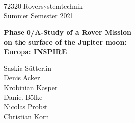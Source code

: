 %
%
\begin{titlepage}
\begin{center}



  \vspace{10mm} 
         {\large \hspace{13mm} \\
         \large \hspace{13mm} \\
         \large \hspace{13mm} \\
         \large \hspace{13mm} 72320 Roversystemtechnik\\
         \centering 
         \hspace{13mm} Summer Semester 2021\\   }
  \vspace{10mm}

         {\Large
          \bf
          \hspace{20mm} Phase 0/A-Study of a Rover Mission \\} 
         {\Large
          \bf
          \hspace{20mm} on the surface of the Jupiter moon:\\
          } 
         {\Large
          \bf
          \hspace{20mm} Europa: INSPIRE\\
          }
 

  \vspace{30mm}
         {\large \hspace{20mm}Saskia Sütterlin}\\       
         {\large \hspace{20mm}Denis Acker}\\
         {\large \hspace{20mm}Krobinian Kasper}\\
         {\large \hspace{20mm}Daniel Bölke}\\
         {\large \hspace{20mm}Nicolas Probst}\\    
         {\large \hspace{20mm}Christian Korn}\\
  \vspace{20mm}
  \makebox[40mm]{}\\


\end{center}
\end{titlepage}

